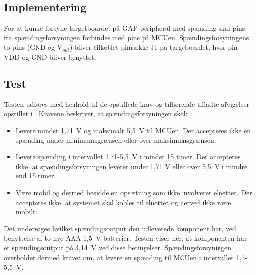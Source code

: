 \subsection{Implementering}
For at kunne forsyne targetboardet på GAP peripheral med spænding skal pins fra spændingsforsyningen forbindes med pins på MCUen. Spændingsforsyningens to pins (GND og V$_{out}$) bliver tilkoblet pinrække J1 på targeboardet, hvor pin VDD og GND bliver benyttet.

\subsection{Test} 
Testen udføres med henhold til de opstillede krav og tilhørende tilladte afvigelser opstillet i . Kravene beskriver, at spændingsforsyningen skal:
\begin{itemize}
	\item Levere mindst 1,71~V og maksimalt 5,5~V til MCUen. Der accepteres ikke en spænding under minimumsgrænsen eller over maksimumsgrænsen.
	\item Levere spænding i intervallet 1,71-5,5~V i mindst 15 timer. Der accepteres ikke, at spændingsforsyningen leverer under 1,71 V eller over 5,5~V i mindre end 15 timer.
	\item Være mobil og dermed besidde en opsætning som ikke involverer elnettet. Der accepteres ikke, at systemet skal kobles til elnettet og derved ikke være mobilt.
\end{itemize}

Det undersøges hvilket spændingsoutput den udleverede komponent har, ved benyttelse af to nye AAA 1,5~V batterier. Testen viser her, at komponenten har et spændingsoutput på 3,14~V ved disse betingelser.\newline
Spændingsforsyningen overholder dermed kravet om, at levere en spænding til MCUen i intervallet 1,7-5,5~V.




